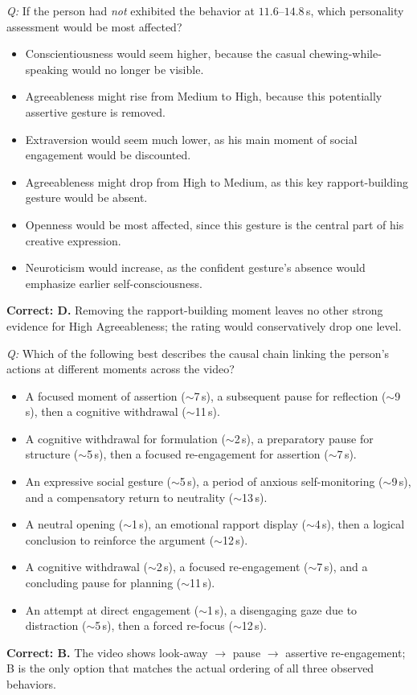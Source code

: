 \documentclass{llmxive}
\begin{document}
\begin{examplebox}[title={(2) Counterfactual Reasoning}]
\emph{Q:} If the person had \emph{not} exhibited the behavior at $11.6$--$14.8$\,s, which personality assessment would be most affected?
\begin{itemize}[leftmargin=1.4em, itemsep=0pt, topsep=1pt, parsep=0pt]
\item[A.] Conscientiousness would seem higher, because the casual chewing-while-speaking would no longer be visible.
\item[B.] Agreeableness might rise from Medium to High, because this potentially assertive gesture is removed.
\item[C.] Extraversion would seem much lower, as his main moment of social engagement would be discounted.
\item[D.] Agreeableness might drop from High to Medium, as this key rapport-building gesture would be absent.
\item[E.] Openness would be most affected, since this gesture is the central part of his creative expression.
\item[F.] Neuroticism would increase, as the confident gesture's absence would emphasize earlier self-consciousness.
\end{itemize}
\textbf{Correct: D.}  Removing the rapport-building moment leaves no other strong evidence for High Agreeableness; the rating would conservatively drop one level.

\end{examplebox}
\begin{examplebox}[title={(3) Temporal-Causal Reasoning}]
\emph{Q:} Which of the following best describes the causal chain linking the person's actions at different moments across the video?
\begin{itemize}[leftmargin=1.4em, itemsep=0pt, topsep=1pt, parsep=0pt]
\item[A.] A focused moment of assertion ($\sim$7\,s), a subsequent pause for reflection ($\sim$9\,s), then a cognitive withdrawal ($\sim$11\,s).
\item[B.] A cognitive withdrawal for formulation ($\sim$2\,s), a preparatory pause for structure ($\sim$5\,s), then a focused re-engagement for assertion ($\sim$7\,s).
\item[C.] An expressive social gesture ($\sim$5\,s), a period of anxious self-monitoring ($\sim$9\,s), and a compensatory return to neutrality ($\sim$13\,s).
\item[D.] A neutral opening ($\sim$1\,s), an emotional rapport display ($\sim$4\,s), then a logical conclusion to reinforce the argument ($\sim$12\,s).
\item[E.] A cognitive withdrawal ($\sim$2\,s), a focused re-engagement ($\sim$7\,s), and a concluding pause for planning ($\sim$11\,s).
\item[F.] An attempt at direct engagement ($\sim$1\,s), a disengaging gaze due to distraction ($\sim$5\,s), then a forced re-focus ($\sim$12\,s).
\end{itemize}
\textbf{Correct: B.}  The video shows look-away $\to$ pause $\to$ assertive re-engagement; B is the only option that matches the actual ordering of all three observed behaviors.

\end{examplebox}
\end{document}
